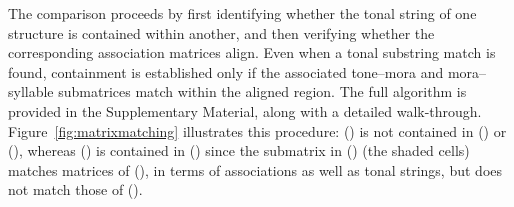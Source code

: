 \documentclass{CUP-JNL-PHO}%
\theoremstyle{definition}
\numberwithin{equation}{section}
\theoremstyle{definition}
\begin{document}
The comparison proceeds by first identifying whether the tonal string of one 
structure is contained within another, and then verifying whether the 
corresponding association matrices align. Even when a tonal substring match 
is found, containment is established only if the associated tone–mora and 
mora–syllable submatrices match within the aligned region. The full algorithm 
is provided in the Supplementary Material, along with a detailed walk-through. 
Figure~\ref{fig:matrixmatching} illustrates this procedure: 
() is not contained in 
() or (), 
whereas () is contained in () since the 
submatrix in () (the shaded cells) matches matrices of 
(), in terms of associations
as well as tonal strings, but does not match those of ().
\end{document}
